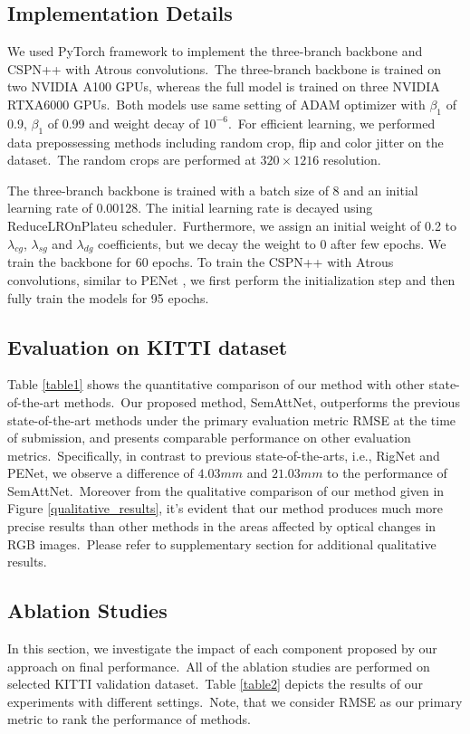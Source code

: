 \documentclass{ieeeaccess}
\begin{document}
\subsection{Implementation Details}


We used PyTorch \cite{PyTorch} framework to implement the three-branch backbone and CSPN++ with Atrous convolutions.~The three-branch backbone is trained on two NVIDIA A100 GPUs, whereas the full model is trained on three NVIDIA RTXA6000 GPUs.~Both models use same setting of ADAM optimizer \cite{kingma2017adam} with $\beta_1$ of  0.9, $\beta_1$ of 0.99 and weight decay of $10^{-6}$.~For efficient learning, we performed data prepossessing methods including random crop, flip and color jitter \cite{ma2018sparse} on the dataset.~The random crops are performed at $320 \times 1216$ resolution. 

 The three-branch backbone is trained with a batch size of 8 and an initial learning rate of 0.00128. The initial learning rate is decayed using ReduceLROnPlateu scheduler.~Furthermore, we assign an initial weight of 0.2 to  $\lambda_{cg}$, $\lambda_{sg}$ and $\lambda_{dg}$ coefficients, but we decay the weight to 0 after few epochs. We train the backbone for 60 epochs. To train the CSPN++ with Atrous convolutions, similar to PENet \cite{hu2020PENet}, we first perform the initialization step and then fully train the models for 95 epochs.

\subsection{Evaluation on KITTI dataset}
Table \ref{table1} shows the quantitative comparison of our method with other state-of-the-art methods.~Our proposed method, SemAttNet, outperforms the previous state-of-the-art methods under the primary evaluation metric RMSE at the time of submission, and presents comparable performance on other evaluation metrics.~Specifically, in contrast to previous state-of-the-arts, i.e., RigNet and PENet, we observe a difference of $4.03mm$ and $21.03mm$ to the performance of SemAttNet.~Moreover from the qualitative comparison of our method given in Figure \ref{qualitative_results}, it's evident that our method produces much more precise results than other methods in the areas affected by optical changes in RGB images.~Please refer to supplementary section for additional qualitative results.

\subsection{Ablation Studies}
In this section, we investigate the impact of each component proposed by our approach on final performance.~All of the ablation studies are performed on selected KITTI validation dataset.~Table \ref{table2} depicts the results of our experiments with different settings.~Note, that we consider RMSE as our primary metric to rank the performance of methods.
\end{document}
